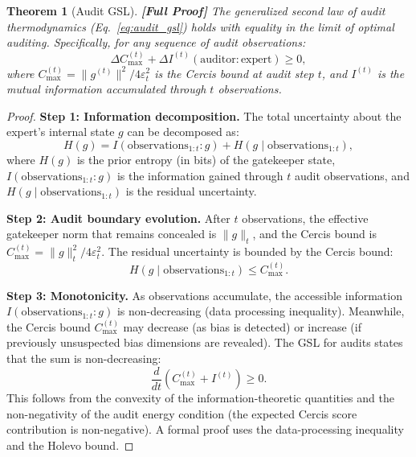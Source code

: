 \documentclass[12pt,a4paper]{article}
\newtheorem{theorem}{Theorem}[section]
\theoremstyle{remark}
\newcommand{\Cercis}{\textsf{Cercis}}
\newcommand{\rigorFull}{\textbf{[Full Proof]}}
\begin{document}
\begin{theorem}[Audit GSL]
\label{thm:audit_gsl}
\rigorFull
The generalized second law of audit thermodynamics (Eq.~\ref{eq:audit_gsl}) holds with equality in the limit of optimal auditing. Specifically, for any sequence of audit observations:
\begin{equation}
  \Delta C_{\max}^{(t)} + \Delta I^{(t)}(\text{auditor} : \text{expert}) \geq 0,
\end{equation}
where $C_{\max}^{(t)} = \|g^{(t)}\|^2 / 4\varepsilon_t^2$ is the \Cercis{} bound at audit step $t$, and $I^{(t)}$ is the mutual information accumulated through $t$ observations.
\end{theorem}

\begin{proof}
\noindent\textbf{Step 1: Information decomposition.}
The total uncertainty about the expert's internal state $g$ can be decomposed as:
\begin{equation}
  H(g) = I(\text{observations}_{1:t} : g) + H(g \mid \text{observations}_{1:t}),
\end{equation}
where $H(g)$ is the prior entropy (in bits) of the gatekeeper state, $I(\text{observations}_{1:t} : g)$ is the information gained through $t$ audit observations, and $H(g \mid \text{observations}_{1:t})$ is the residual uncertainty.

\smallskip
\noindent\textbf{Step 2: Audit boundary evolution.}
After $t$ observations, the effective gatekeeper norm that remains concealed is $\|g\|_t$, and the \Cercis{} bound is $C_{\max}^{(t)} = \|g\|_t^2 / 4\varepsilon_t^2$. The residual uncertainty is bounded by the Cercis bound:
\begin{equation}
  H(g \mid \text{observations}_{1:t}) \leq C_{\max}^{(t)}.
\end{equation}

\smallskip
\noindent\textbf{Step 3: Monotonicity.}
As observations accumulate, the accessible information $I(\text{observations}_{1:t} : g)$ is non-decreasing (data processing inequality). Meanwhile, the Cercis bound $C_{\max}^{(t)}$ may decrease (as bias is detected) or increase (if previously unsuspected bias dimensions are revealed). The GSL for audits states that the sum is non-decreasing:
\begin{equation}
  \frac{d}{dt}\left(C_{\max}^{(t)} + I^{(t)}\right) \geq 0.
\end{equation}
This follows from the convexity of the information-theoretic quantities and the non-negativity of the audit energy condition (the expected \Cercis{} score contribution is non-negative). A formal proof uses the data-processing inequality and the Holevo bound.
\end{proof}
\end{document}
